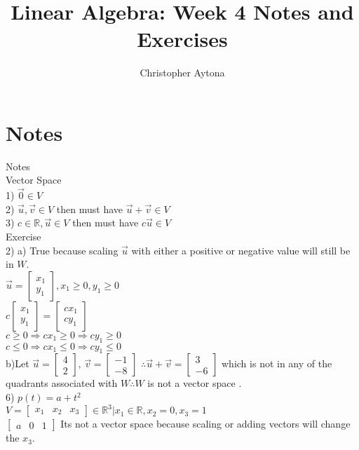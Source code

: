 \documentclass[a4paper]{article}
\begin{document}
\title{Linear Algebra: Week 4 Notes and Exercises}
\author{Christopher Aytona}
\maketitle

\section{Notes}
Notes\\

Vector Space\\
1) $\vec{0} \in V$\\
2) $\vec{u}, \vec{v} \in V$ then must have $\vec{u} + \vec{v} \in V$\\
3) $c \in \mathbb{R}, \vec{u} \in V$ then must have $c \vec{u} \in V$\\
Exercise\\

2) a) True because scaling $\vec{u}$ with either a positive or negative value will still be in $W$.\\
$\vec{u} = \begin{bmatrix}
x_1\\
y_1
\end{bmatrix}, x_1 \geq 0, y_1 \geq 0$\\
$c \begin{bmatrix}
x_1\\
y_1
\end{bmatrix} = \begin{bmatrix}
cx_1\\
cy_1
\end{bmatrix}$\\
$c \geq 0 \Rightarrow cx_1 \geq 0 \Rightarrow cy_1 \geq 0$\\
$c \leq 0 \Rightarrow cx_1 \leq 0 \Rightarrow cy_1 \leq 0$\\
b)Let $\vec{u} = \begin{bmatrix}
4\\
2
\end{bmatrix}$, $\vec{v} = \begin{bmatrix}
-1\\
-8
\end{bmatrix}$ $\therefore \vec{u} + \vec{v} = \begin{bmatrix}
3\\
-6
\end{bmatrix}$ which is not in any of the quadrants associated with $W \therefore W$ is not a vector space .\\

6) $p(t) = a + t^2$\\
$V = \begin{bmatrix}
x_1&x_2&x_3
\end{bmatrix} \in \mathbb{R}^3 | x_1 \in \mathbb{R}, x_2 = 0, x_3 = 1$\\
$\begin{bmatrix}
a&0&1
\end{bmatrix}$
Its not a vector space because scaling or adding vectors will change the $x_3$.
\end{document}
